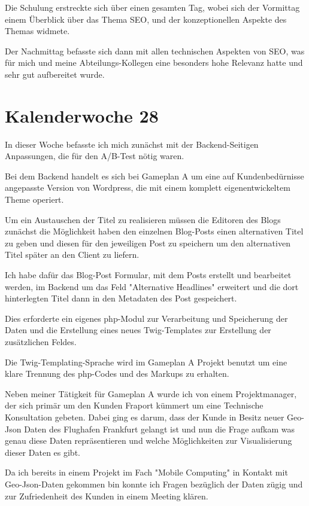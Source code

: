 \documentclass[11pt]{article} %
\begin{document}
Die Schulung erstreckte sich über einen gesamten Tag, wobei sich der Vormittag einem Überblick über das Thema SEO, und der konzeptionellen
Aspekte des Themas widmete. 

Der Nachmittag befasste sich dann mit allen technischen Aspekten von SEO, was für mich und meine Abteilungs-Kollegen eine besonders hohe Relevanz hatte und sehr gut aufbereitet wurde.

\section{Kalenderwoche 28} \label{sec:kw2}

In dieser Woche befasste ich mich zunächst mit der Backend-Seitigen Anpassungen, die für den A/B-Test nötig waren.

Bei dem Backend handelt es sich bei Gameplan A um eine auf Kundenbedürnisse angepasste Version von Wordpress, die mit einem komplett eigenentwickeltem Theme operiert.

Um ein Austauschen der Titel zu realisieren müssen die Editoren des Blogs zunächst die Möglichkeit haben den einzelnen Blog-Posts einen alternativen Titel zu geben und diesen für den jeweiligen Post zu speichern um den alternativen Titel später an den Client zu liefern.

Ich habe dafür das Blog-Post Formular, mit dem Posts erstellt und bearbeitet werden, im Backend um das Feld "Alternative Headlines" erweitert und die dort hinterlegten Titel dann in den Metadaten des Post gespeichert.

Dies erforderte ein eigenes php-Modul zur Verarbeitung und Speicherung der Daten und die Erstellung eines neues Twig-Templates zur Erstellung der zusätzlichen Feldes.

Die Twig-Templating-Sprache wird im Gameplan A Projekt benutzt um eine klare Trennung des php-Codes und des Markups zu erhalten.

Neben meiner Tätigkeit für Gameplan A wurde ich von einem Projektmanager, der sich primär um den Kunden Fraport kümmert um eine Technische Konsultation gebeten. Dabei ging es darum, dass der Kunde in Besitz neuer Geo-Json Daten des Flughafen Frankfurt gelangt ist und nun die Frage aufkam was genau diese Daten repräsentieren und welche Möglichkeiten zur Visualisierung dieser Daten es gibt.

Da ich bereits in einem Projekt im Fach "Mobile Computing" in Kontakt mit Geo-Json-Daten gekommen bin konnte ich Fragen bezüglich der Daten zügig und zur Zufriedenheit des Kunden in einem Meeting klären.
\end{document}

